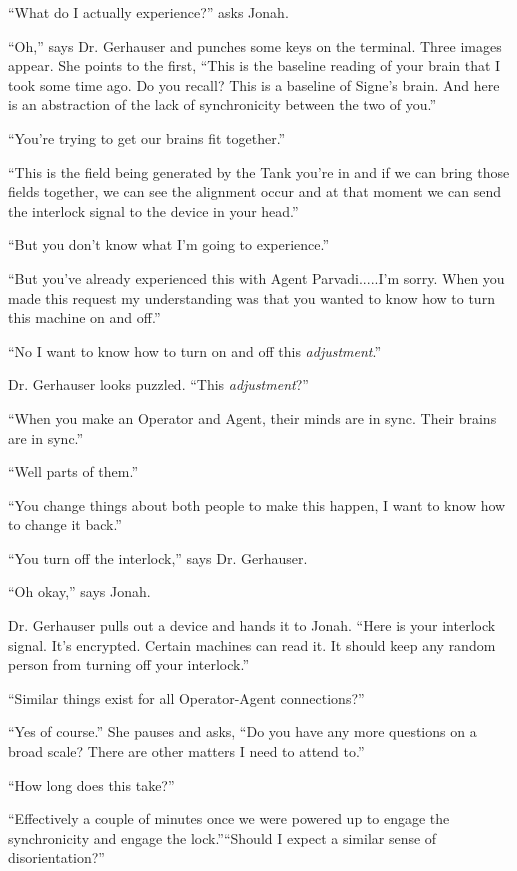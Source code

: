 ``What do I actually experience?'' asks Jonah.

``Oh,'' says Dr. Gerhauser and punches some keys on the terminal.  Three images appear.  She points to the first, ``This is the baseline reading of your brain that I took some time ago.  Do you recall?  This is a baseline of Signe's brain.  And here is an abstraction of the lack of synchronicity between the two of you.''

``You're trying to get our brains fit together.''

``This is the field being generated by the Tank you're in and if we can bring those fields together, we can see the alignment occur and at that moment we can send the interlock signal to the device in your head.''

``But you don't know what I'm going to experience.''

``But you've already experienced this with Agent Parvadi.....I'm sorry.  When you made this request my understanding was that you wanted to know how to turn this machine on and off.''

``No I want to know how to turn on and off this \textit{adjustment}.''

Dr. Gerhauser looks puzzled.  ``This \textit{adjustment}?''

``When you make an Operator and Agent, their minds are in sync.  Their brains are in sync.''

``Well parts of them.''

``You change things about both people to make this happen, I want to know how to change it back.''

``You turn off the interlock,'' says Dr. Gerhauser.  

``Oh okay,'' says Jonah.

Dr. Gerhauser pulls out a device and hands it to Jonah. ``Here is your interlock signal.  It's encrypted. Certain machines can read it.  It should keep any random person from turning off your interlock.''

``Similar things exist for all Operator-Agent connections?''

``Yes of course.''  She pauses and asks, ``Do you have any more questions on a broad scale?  There are other matters I need to attend to.''

``How long does this take?''

``Effectively a couple of minutes once we were powered up to engage the synchronicity and engage the lock.''``Should I expect a similar sense of disorientation?''

